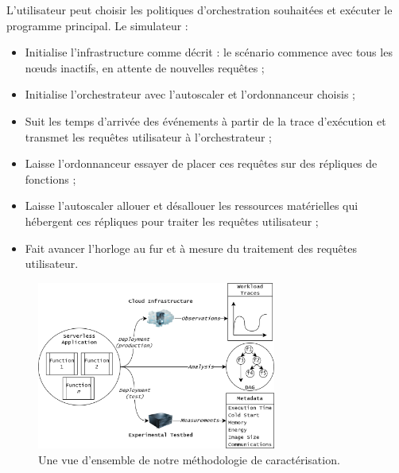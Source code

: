 L'utilisateur peut choisir les politiques d'orchestration souhaitées et exécuter le programme principal. Le simulateur :

\begin{itemize}
    \item Initialise l'infrastructure comme décrit : le scénario commence avec tous les nœuds inactifs, en attente de nouvelles requêtes ;
    \item Initialise l'orchestrateur avec l'autoscaler et l'ordonnanceur choisis ;
    \item Suit les temps d'arrivée des événements à partir de la trace d'exécution et transmet les requêtes utilisateur à l'orchestrateur ;
    \item Laisse l'ordonnanceur essayer de placer ces requêtes sur des répliques de fonctions ;
    \item Laisse l'autoscaler allouer et désallouer les ressources matérielles qui hébergent ces répliques pour traiter les requêtes utilisateur ;
    \item Fait avancer l'horloge au fur et à mesure du traitement des requêtes utilisateur.
\end{itemize}


\begin{figure}[!ht]
    \centering
    \includegraphics[width=0.7\textwidth]{6_Chapitre6/figures/characterization.png}
    \caption{Une vue d'ensemble de notre méthodologie de caractérisation.}
\label{figure:herosim-characterization}
\end{figure}

